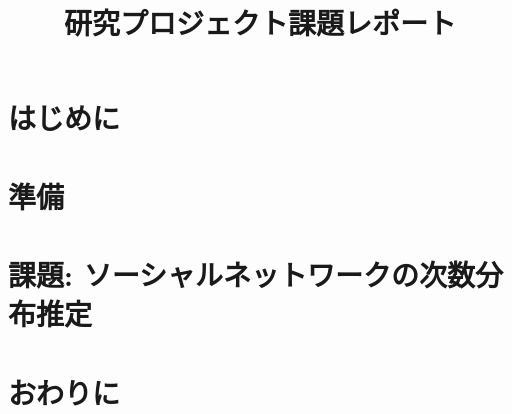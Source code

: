 \documentclass{ujarticle}
\title{研究プロジェクト課題レポート}
\author{}
\begin{document}
\date{}
\maketitle


\section{はじめに}


\section{準備}


\section{課題: ソーシャルネットワークの次数分布推定}



\section{おわりに}



 
\end{document}
